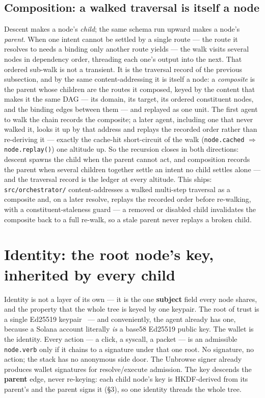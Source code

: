 \documentclass[11pt]{article}
\begin{document}
\subsection{Composition: a walked traversal is itself a node}

Descent makes a node's \emph{child}; the same schema run upward makes a node's
\emph{parent}. When one intent cannot be settled by a single route --- the route it
resolves to needs a binding only another route yields --- the walk visits several
nodes in dependency order, threading each one's output into the next. That ordered
sub-walk is not a transient. It is the traversal record of the previous subsection,
and by the same content-addressing it is itself a node: a \emph{composite} is the
parent whose children are the routes it composed, keyed by the content that makes it
the same DAG --- its domain, its target, its ordered constituent nodes, and the
binding edges between them --- and replayed as one unit. The first agent to walk the
chain records the composite; a later agent, including one that never walked it, looks
it up by that address and replays the recorded order rather than re-deriving it ---
exactly the cache-hit short-circuit of the walk (\texttt{node.cached}
$\Rightarrow$ \texttt{node.replay()}) one altitude up. So the recursion closes in
both directions: descent spawns the child when the parent cannot act, and composition
records the parent when several children together settle an intent no child settles
alone --- and the traversal record is the ledger at every altitude. This ships:
\texttt{src/orchestrator/} content-addresses a walked multi-step traversal as a
composite and, on a later resolve, replays the recorded order before re-walking, with
a constituent-staleness guard --- a removed or disabled child invalidates the
composite back to a full re-walk, so a stale parent never replays a broken child.

\section{Identity: the root node's key, inherited by every child}
Identity is not a layer of its own --- it is the one \textbf{subject} field every
node shares, and the property that the whole tree is keyed by one keypair. The root
of trust is a single Ed25519 keypair~\cite{rfc8032} --- and conveniently, the agent
already has one, because a Solana account literally \emph{is} a base58 Ed25519 public
key. The wallet is the identity. Every action --- a click, a syscall, a packet --- is
an admissible \texttt{node.verb} only if it chains to a signature under that one root.
No signature, no action; the stack has no anonymous side door. The Unbrowse signer
already produces wallet signatures for resolve/execute admission. The key descends the
\textbf{parent} edge, never re-keying: each child node's key is HKDF-derived from its
parent's and the parent signs it (\S3), so one identity threads the whole tree.
\end{document}
